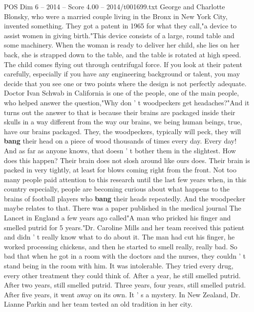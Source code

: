 \begin{textsample}{POS Dim 6 – 2014 – Score 4.00 – 2014/t001699.txt}  \label{ex:f6_pos_049}
George and Charlotte Blonsky, who were a married couple living in the Bronx in New York City, invented something.
They got a patent in 1965 for what they call,"a device to assist women in giving birth."This device consists of a large, round table and some machinery.
When the woman is ready to deliver her child, she lies on her back, she is strapped down to the table, and the table is rotated at high speed.
The child comes flying out through centrifugal force.
If you look at their patent carefully, especially if you have any engineering background or talent, you may decide that you see one or two points where the design is not perfectly adequate.
Doctor Ivan Schwab in California is one of the people, one of the main people, who helped answer the question,"Why don ' t woodpeckers get headaches?"And it turns out the answer to that is because their brains are packaged inside their skulls in a way different from the way our brains, we being human beings, true, have our brains packaged.
They, the woodpeckers, typically will peck, they will \textbf{bang} their head on a piece of wood thousands of times every day.
Every day!
And as far as anyone knows, that doesn ' t bother them in the slightest.
How does this happen?
Their brain does not slosh around like ours does.
Their brain is packed in very tightly, at least for blows coming right from the front.
Not too many people paid attention to this research until the last few years when, in this country especially, people are becoming curious about what happens to the brains of football players who \textbf{bang} their heads repeatedly.
And the woodpecker maybe relates to that.
There was a paper published in the medical journal The Lancet in England a few years ago called"A man who pricked his finger and smelled putrid for 5 years."Dr.
Caroline Mills and her team received this patient and didn ' t really know what to do about it.
The man had cut his finger, he worked processing chickens, and then he started to smell really, really bad.
So bad that when he got in a room with the doctors and the nurses, they couldn ' t stand being in the room with him.
It was intolerable.
They tried every drug, every other treatment they could think of.
After a year, he still smelled putrid.
After two years, still smelled putrid.
Three years, four years, still smelled putrid.
After five years, it went away on its own.
It ' s a mystery.
In New Zealand, Dr.
Lianne Parkin and her team tested an old tradition in her city.

\end{textsample}
